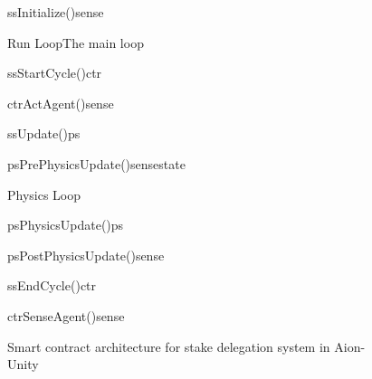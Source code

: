 \begin{figure}[ht]
\centering
\begin {sequencediagram}
  \begin {call}{ss}{Initialize()}{sense}{}
  \end {call}
  \begin {sdblock}{Run Loop}{The main loop}
    \begin {call}{ss}{StartCycle()}{ctr}{}
      \begin {call}{ctr}{ActAgent()}{sense}{}
      \end {call}
    \end {call}
    \begin {call}{ss}{Update()}{ps}{}
      \begin {messcall}{ps}{PrePhysicsUpdate()}{sense}{state}
      \end {messcall}
      \begin {sdblock}{Physics Loop}{}
        \begin {call}{ps}{PhysicsUpdate()}{ps}{}
        \end {call}
      \end {sdblock}
      \begin {call}{ps}{PostPhysicsUpdate()}{sense}{}
      \end {call}
    \end {call}
    \begin {call}{ss}{EndCycle()}{ctr}{}
      \begin {call}{ctr}{SenseAgent()}{sense}{}
      \end {call}
    \end {call}
  \end {sdblock}
\end {sequencediagram}
\caption{Smart contract architecture for stake delegation system in Aion-Unity}
\label{fig:priv_staking}
\end{figure}




